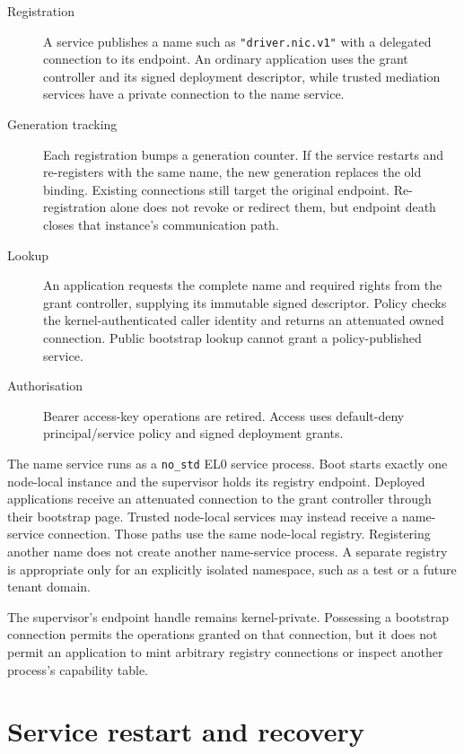 \begin{description}
    \item[Registration] A service publishes a name such as
        \texttt{"driver.nic.v1"} with a delegated connection to its endpoint.
        An ordinary application uses the grant controller and its signed
        deployment descriptor, while trusted mediation services have a private
        connection to the name service.
    \item[Generation tracking] Each registration bumps a generation counter.
        If the service restarts and re-registers with the same name, the new
        generation replaces the old binding. Existing connections still target
        the original endpoint. Re-registration alone does not revoke or redirect
        them, but endpoint death closes that instance's communication path.
    \item[Lookup] An application requests the complete name and required rights
        from the grant controller, supplying its immutable signed descriptor.
        Policy checks the kernel-authenticated caller identity and returns an
        attenuated owned connection. Public bootstrap lookup cannot grant a
        policy-published service.
    \item[Authorisation] Bearer access-key operations are retired. Access uses
        default-deny principal/service policy and signed deployment grants.
\end{description}

The name service runs as a \texttt{no\_std} EL0 service process. Boot starts
exactly one node-local instance and the supervisor holds its registry
endpoint. Deployed applications receive an attenuated connection to the grant
controller through their bootstrap page. Trusted node-local services may instead
receive a name-service connection. Those paths use the same
node-local registry. Registering another name does not create
another name-service process. A separate registry is appropriate only for an
explicitly isolated namespace, such as a test or a future tenant domain.

The supervisor's endpoint handle remains kernel-private. Possessing a
bootstrap connection permits the operations granted on that connection, but it
does not permit an application to mint arbitrary registry connections or
inspect another process's capability table.

\section{Service restart and recovery}

